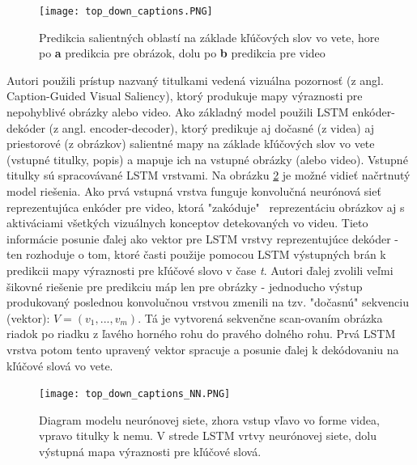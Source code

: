 \begin{figure}[H]
	\begin{center}
		\texttt{[image: top\_down\_captions.PNG]}
		\caption[Predikcia salientných oblastí na základe kľúčových slov vo vete]{Predikcia salientných oblastí na základe kľúčových slov vo vete, hore po \textbf{a} predikcia pre obrázok, dolu po \textbf{b} predikcia pre video\cite{ramanishka2017top}\label{top_down_captions_image}}
	\end{center}
\end{figure}

Autori použili prístup nazvaný titulkami vedená vizuálna pozornosť (z angl. Caption-Guided Visual Saliency), ktorý produkuje mapy výraznosti pre nepohyblivé obrázky alebo video. Ako základný model použili LSTM enkóder-dekóder (z angl. encoder-decoder), ktorý predikuje aj dočasné (z videa) aj priestorové (z obrázkov) salientné mapy na základe kľúčových slov vo vete (vstupné titulky, popis) a mapuje ich na vstupné obrázky (alebo video). Vstupné titulky sú spracovávané LSTM vrstvami. Na obrázku \ref{top_down_captions_model_image} je možné vidieť načrtnutý model riešenia. Ako prvá vstupná vrstva funguje konvolučná neurónová sieť reprezentujúca enkóder pre video, ktorá "zakóduje" \ reprezentáciu obrázkov aj s aktiváciami všetkých vizuálnych konceptov detekovaných vo videu. Tieto informácie posunie ďalej ako vektor pre LSTM vrstvy reprezentujúce dekóder - ten rozhoduje o tom, ktoré časti použije pomocou LSTM výstupných brán k predikcii mapy výraznosti pre kľúčové slovo v čase \textit{t}. Autori ďalej zvolili veľmi šikovné riešenie pre predikciu máp len pre obrázky - jednoducho výstup produkovaný poslednou konvolučnou vrstvou zmenili na tzv. "dočasnú" sekvenciu (vektor): $V = (v_1, . . . , v_m)$. Tá je vytvorená sekvenčne scan-ovaním obrázka riadok po riadku z ľavého horného rohu do pravého dolného rohu. Prvá LSTM vrstva potom tento upravený vektor spracuje a posunie ďalej k dekódovaniu na kľúčové slová vo vete.

\begin{figure}[H]
	\begin{center}
		\texttt{[image: top\_down\_captions\_NN.PNG]}
		\caption[Model neurónovej siete pre predikciu na základe kľúčových slov]{Diagram modelu neurónovej siete\cite{ramanishka2017top}, zhora vstup vľavo vo forme videa, vpravo titulky k nemu. V strede LSTM vrtvy neurónovej siete, dolu výstupná mapa výraznosti pre kľúčové slová. \label{top_down_captions_model_image}}
	\end{center}
\end{figure}

